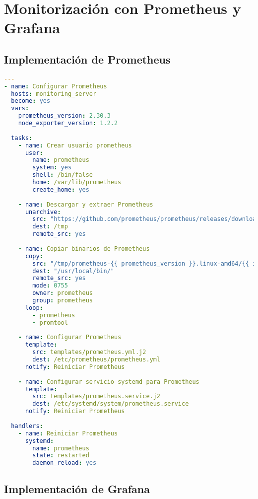 \documentclass[12pt,a4paper]{report}
\begin{document}
\section{Monitorización con Prometheus y Grafana}

\subsection{Implementación de Prometheus}

\begin{lstlisting}[language=yaml]
---
- name: Configurar Prometheus
  hosts: monitoring_server
  become: yes
  vars:
    prometheus_version: 2.30.3
    node_exporter_version: 1.2.2
  
  tasks:
    - name: Crear usuario prometheus
      user:
        name: prometheus
        system: yes
        shell: /bin/false
        home: /var/lib/prometheus
        create_home: yes
    
    - name: Descargar y extraer Prometheus
      unarchive:
        src: "https://github.com/prometheus/prometheus/releases/download/v{{ prometheus_version }}/prometheus-{{ prometheus_version }}.linux-amd64.tar.gz"
        dest: /tmp
        remote_src: yes
    
    - name: Copiar binarios de Prometheus
      copy:
        src: "/tmp/prometheus-{{ prometheus_version }}.linux-amd64/{{ item }}"
        dest: "/usr/local/bin/"
        remote_src: yes
        mode: 0755
        owner: prometheus
        group: prometheus
      loop:
        - prometheus
        - promtool
    
    - name: Configurar Prometheus
      template:
        src: templates/prometheus.yml.j2
        dest: /etc/prometheus/prometheus.yml
      notify: Reiniciar Prometheus
    
    - name: Configurar servicio systemd para Prometheus
      template:
        src: templates/prometheus.service.j2
        dest: /etc/systemd/system/prometheus.service
      notify: Reiniciar Prometheus
  
  handlers:
    - name: Reiniciar Prometheus
      systemd:
        name: prometheus
        state: restarted
        daemon_reload: yes
\end{lstlisting}

\subsection{Implementación de Grafana}
\end{document}
